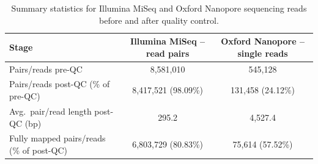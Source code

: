 \begin{table}[ht]
\centering
\begin{tabular}{lcc}
\hline
\textbf{Stage} & \textbf{Illumina MiSeq -- read pairs} & \textbf{Oxford Nanopore -- single reads} \\
\hline
Pairs/reads pre-QC &
8,581,010 &
545,128 \\

Pairs/reads post-QC (\% of pre-QC) &
8,417,521 (98.09\%) &
131,458 (24.12\%) \\

Avg.\ pair/read length post-QC (bp) &
295.2 &
4,527.4 \\

Fully mapped pairs/reads (\% of post-QC) &
6,803,729 (80.83\%) &
75,614 (57.52\%) \\
\hline
\end{tabular}
\caption{Summary statistics for Illumina MiSeq and Oxford Nanopore sequencing reads before and after quality control.}
\label{tab:sequencing_summary}
\end{table}
